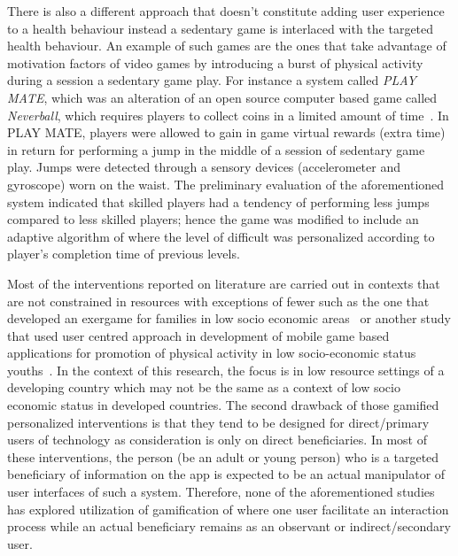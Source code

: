 There is also a different approach that doesn't constitute adding user experience to a health behaviour instead a sedentary game is interlaced with the targeted health behaviour. An example of such games are the ones that take advantage of motivation factors of video games by introducing a burst of physical activity during a session a sedentary game play. For instance a system called \emph{PLAY MATE}, which was an alteration of an open source computer based game called \emph{Neverball},  which requires players to collect coins in a limited amount of time~\citep{berkovsky2012physical}. In PLAY MATE, players were allowed to gain in game virtual rewards (extra time) in return for performing a jump in the middle of a session of sedentary game play. Jumps were detected through a sensory devices (accelerometer and gyroscope) worn on the waist. The preliminary evaluation of the aforementioned system indicated that skilled players had a tendency of performing less jumps compared to less skilled players; hence the game was modified to include an adaptive algorithm of where the level of difficult was personalized according to player's completion time of previous levels.

Most of the interventions reported on literature are carried out in contexts that are not constrained in resources with exceptions of fewer such as the one that developed an exergame for families in low socio economic areas~\citep{saksono2015spaceship} or another study that used user centred approach in development of mobile game based applications for promotion of physical activity in low socio-economic status youths~\citep{blackman2016developing}. In the context of this research, the focus is in low resource settings of a developing country which may not be the same as a context of low socio economic status in developed countries. The second drawback of those gamified personalized interventions is that they tend to be designed for direct/primary users of technology as consideration is only on direct beneficiaries. In most of these interventions, the person (be an adult or young person) who is a targeted beneficiary of information on the app is expected to be an actual manipulator of user interfaces of such a system. Therefore, none of the aforementioned studies has explored utilization of gamification of where one user facilitate an interaction process while an actual beneficiary remains as an observant or indirect/secondary user.   


\begin{flushright}
\end{flushright}
